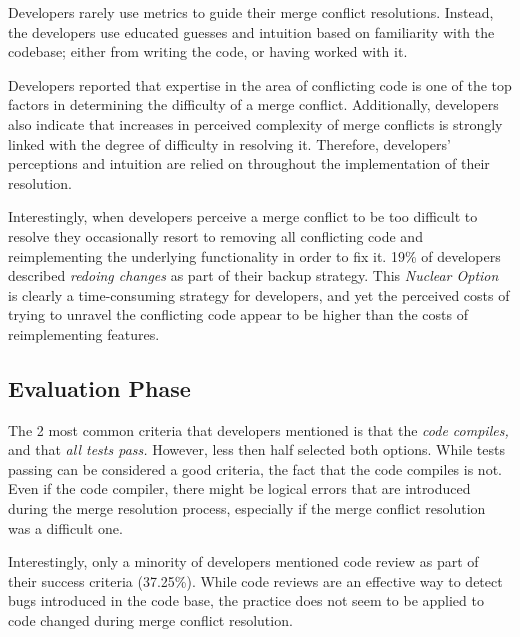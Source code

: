 Developers rarely use metrics to guide their merge conflict resolutions.
Instead, the developers use educated guesses and intuition based on familiarity with the codebase; either from writing the code, or having worked with it.

Developers reported that expertise in the area of conflicting code is one of the top factors in determining the difficulty of a merge conflict.
Additionally, developers also indicate that increases in perceived complexity of merge conflicts is strongly linked with the degree of difficulty in resolving it.
Therefore, developers' perceptions and intuition are relied on throughout the implementation of their resolution.

Interestingly, when developers perceive a merge conflict to be too difficult to resolve they occasionally resort to removing all conflicting code and reimplementing the underlying functionality in order to fix it.
19\% of developers described \textit{redoing changes} as part of their backup strategy.
This \textit{Nuclear Option} is clearly a time-consuming strategy for developers, and yet the perceived costs of trying to unravel the conflicting code appear to be higher than the costs of reimplementing features.

\subsection{Evaluation Phase}

The 2 most common criteria that developers mentioned is that the \emph{code compiles,} and that \emph{all tests pass.}
However, less then half selected both options.
While tests passing can be considered a good criteria, the fact that the code compiles is not.
Even if the code compiler, there might be logical errors that are introduced during the merge resolution process, especially if the merge conflict resolution was a difficult one.

Interestingly, only a minority of developers mentioned code review as part of their success criteria (37.25\%).
While code reviews are an effective way to detect bugs introduced in the code base, the practice does not seem to be applied to code changed during merge conflict resolution.

